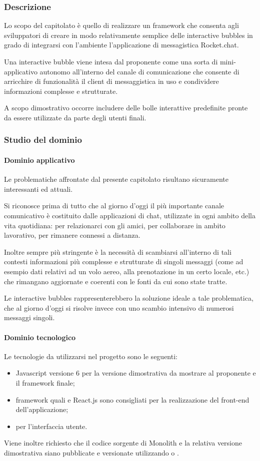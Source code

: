 		\subsubsection{Descrizione}
		Lo scopo del capitolato è quello di realizzare un framework che consenta agli sviluppatori di creare in modo relativamente semplice delle 
		interactive bubbles in grado di integrarsi con l'ambiente l'applicazione di messagistica Rocket.chat.

		Una interactive bubble viene intesa dal proponente come una sorta di mini-applicativo autonomo all'interno del canale di comunicazione 
		che consente di arricchire di funzionalità il client di messaggistica in uso e condividere informazioni complesse e strutturate. 

		A scopo dimostrativo occorre includere delle bolle interattive predefinite pronte da essere utilizzate da parte degli utenti finali.
		
		\subsubsection{Studio del dominio}
			\paragraph{Dominio applicativo}
			Le problematiche affrontate dal presente capitolato risultano sicuramente interessanti ed attuali.

			Si riconosce prima di tutto che al giorno d'oggi il più importante canale comunicativo è costituito dalle applicazioni di chat, utilizzate in ogni ambito della vita quotidiana: per relazionarci con gli amici, per collaborare in ambito lavorativo, per rimanere 
			connessi a distanza.

			Inoltre sempre più stringente è la necessità di scambiarsi all'interno di tali contesti informazioni più complesse e strutturate di singoli messaggi (come ad esempio dati relativi ad un volo aereo, alla prenotazione in un certo locale, etc.) che rimangano aggiornate e coerenti con le fonti da cui sono state tratte.

			Le interactive bubbles rappresenterebbero la soluzione ideale a tale problematica, che al giorno d'oggi si risolve invece con uno scambio intensivo di numerosi messaggi singoli. 
			\paragraph{Dominio tecnologico}
			Le tecnologie da utilizzarsi nel progetto sono le seguenti:
			\begin{itemize}
				\item Javascript versione 6 per la versione dimostrativa da mostrare al proponente e il framework finale;
				\item framework quali  e React.js sono consigliati per la realizzazione del front-end dell'applicazione;
				\item {} per l'interfaccia utente.
			\end{itemize}
			Viene inoltre richiesto che il codice sorgente di Monolith e la relativa versione dimostrativa siano pubblicate e versionate utilizzando 
			 o .
